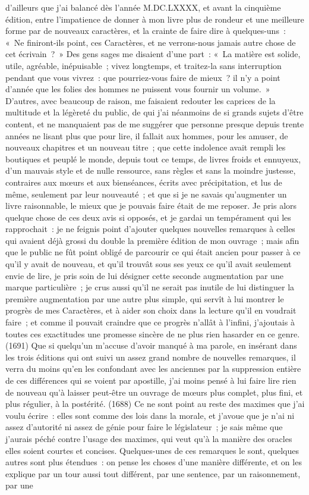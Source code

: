 \documentclass[french,twoside]{book} %
\newcommand{\ed}[1]{ {\color{silver}\sffamily\footnotesize (#1)} } %
\begin{document}
d’ailleurs que j’ai balancé dès l’année M.DC.LXXXX, et avant la cinquième édition, entre l’impatience de donner à mon livre plus de rondeur et une meilleure forme par de nouveaux caractères, et la crainte de faire dire à quelques-uns : « Ne finiront-ils point, ces Caractères, et ne verrons-nous jamais autre chose de cet écrivain ? » Des gens sages me disaient d’une part : « La matière est solide, utile, agréable, inépuisable ; vivez longtemps, et traitez-la sans interruption pendant que vous vivrez : que pourriez-vous faire de mieux ? il n’y a point d’année que les folies des hommes ne puissent vous fournir un volume. » D'autres, avec beaucoup de raison, me faisaient redouter les caprices de la multitude et la légèreté du public, de qui j’ai néanmoins de si grands sujets d’être content, et ne manquaient pas de me suggérer que personne presque depuis trente années ne lisant plus que pour lire, il fallait aux hommes, pour les amuser, de nouveaux chapitres et un nouveau titre ; que cette indolence avait rempli les boutiques et peuplé le monde, depuis tout ce temps, de livres froids et ennuyeux, d’un mauvais style et de nulle ressource, sans règles et sans la moindre justesse, contraires aux mœurs et aux bienséances, écrits avec précipitation, et lus de même, seulement par leur nouveauté ; et que si je ne savais qu’augmenter un livre raisonnable, le mieux que je pouvais faire était de me reposer. Je pris alors quelque chose de ces deux avis si opposés, et je gardai un tempérament qui les rapprochait : je ne feignis point d’ajouter quelques nouvelles remarques à celles qui avaient déjà grossi du double la première édition de mon ouvrage ; mais afin que le public ne fût point obligé de parcourir ce qui était ancien pour passer à ce qu’il y avait de nouveau, et qu’il trouvât sous ses yeux ce qu’il avait seulement envie de lire, je pris soin de lui désigner cette seconde augmentation par une marque particulière ; je crus aussi qu’il ne serait pas inutile de lui distinguer la première augmentation par une autre plus simple, qui servît à lui montrer le progrès de mes Caractères, et à aider son choix dans la lecture qu’il en voudrait faire ; et comme il pouvait craindre que ce progrès n’allât à l’infini, j’ajoutais à toutes ces exactitudes une promesse sincère de ne plus rien hasarder en ce genre. \ed{1691}Que si quelqu’un m’accuse d’avoir manqué à ma parole, en insérant dans les trois éditions qui ont suivi un assez grand nombre de nouvelles remarques, il verra du moins qu’en les confondant avec les anciennes par la suppression entière de ces différences qui se voient par apostille, j’ai moins pensé à lui faire lire rien de nouveau qu’à laisser peut-être un ouvrage de mœurs plus complet, plus fini, et plus régulier, à la postérité. \ed{1688}Ce ne sont point au reste des maximes que j’ai voulu écrire : elles sont comme des lois dans la morale, et j’avoue que je n’ai ni assez d’autorité ni assez de génie pour faire le législateur ; je sais même que j’aurais péché contre l’usage des maximes, qui veut qu’à la manière des oracles elles soient courtes et concises. Quelques-unes de ces remarques le sont, quelques autres sont plus étendues : on pense les choses d’une manière différente, et on les explique par un tour aussi tout différent, par une sentence, par un raisonnement, par une 
\end{document}

